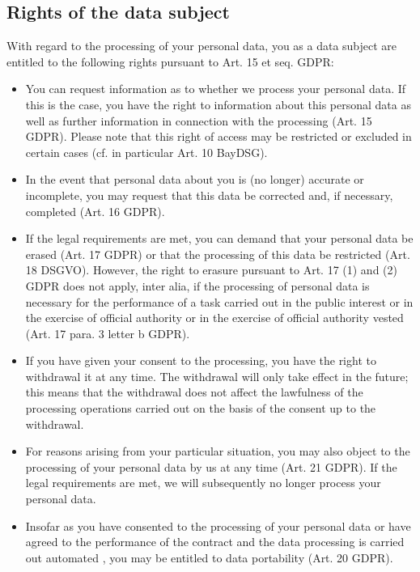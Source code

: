 \documentclass[letterpaper,10pt,english]{sphinxmanual}
\begin{document}
\subsection{Rights of the data subject}
\label{\detokenize{policies/privacy:rights-of-the-data-subject}}
\sphinxAtStartPar
With regard to the processing of your personal data, you as a data subject are entitled to the following rights pursuant to Art. 15 et seq. GDPR:
\begin{itemize}
\item {} 
\sphinxAtStartPar
You can request information as to whether we process your personal data. If this is the case, you have the right to information about this personal data as well as further information in connection with the processing (Art. 15 GDPR). Please note that this right of access may be restricted or excluded in certain cases (cf. in particular Art. 10 BayDSG).

\item {} 
\sphinxAtStartPar
In the event that personal data about you is (no longer) accurate or incomplete, you may request that this data be corrected and, if necessary, completed (Art. 16 GDPR).

\item {} 
\sphinxAtStartPar
If the legal requirements are met, you can demand that your personal data be erased (Art. 17 GDPR) or that the processing of this data be restricted (Art. 18 DSGVO). However, the right to erasure pursuant to Art. 17 (1) and (2) GDPR does not apply, inter alia, if the processing of personal data is necessary for the performance of a task carried out in the public interest or in the exercise of official authority or in the exercise of official authority vested (Art. 17 para. 3 letter b GDPR).

\item {} 
\sphinxAtStartPar
If you have given your consent to the processing, you have the right to withdrawal it at any time. The withdrawal will only take effect in the future; this means that the withdrawal does not affect the lawfulness of the processing operations carried out on the basis of the consent up to the withdrawal.

\item {} 
\sphinxAtStartPar
For reasons arising from your particular situation, you may also object to the processing of your personal data by us at any time (Art. 21 GDPR). If the legal requirements are met, we will subsequently no longer process your personal data.

\item {} 
\sphinxAtStartPar
Insofar as you have consented to the processing of your personal data or have agreed to the performance of the contract and the data processing is carried out automated , you may be entitled to data portability (Art. 20 GDPR).


\end{itemize}
\end{document}
